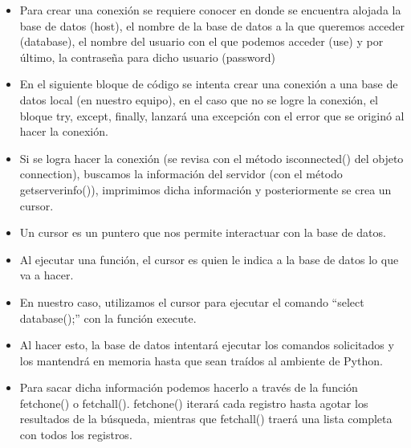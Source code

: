 \documentclass[hyperref={pdfpagelabels=false},xcolor=pst,pdf,fragile]{beamer}
\begin{document}
\begin{frame}
    \begin{itemize}
    \item Para crear una conexión se requiere conocer en donde se encuentra alojada la base de datos (host), el nombre de la base de datos a la que queremos acceder (database), el nombre del usuario con el que podemos acceder (use) y por último, la contraseña para dicho usuario (password)
    \pause
    \item En el siguiente bloque de código se intenta crear una conexión a una base de datos local (en nuestro equipo), en el caso que no se logre la conexión, el bloque try, except, finally, lanzará una excepción con el error que se originó al hacer la conexión.
    \end{itemize}
\end{frame}

\begin{frame}
    \begin{itemize}
    \item Si se logra hacer la conexión (se revisa con el método is\textunderscore connected() del objeto connection), buscamos la información del servidor (con el método get\textunderscore server\textunderscore info()), imprimimos dicha información y posteriormente se crea un cursor.
    \pause
    \item Un cursor es un puntero que nos permite interactuar con la base de datos.
    \item Al ejecutar una función, el cursor es quien le indica a la base de datos lo que va a hacer.
    \pause
    \item En nuestro caso, utilizamos el cursor para ejecutar el comando “select database();” con la función execute.
    \end{itemize}
\end{frame}

\begin{frame}
    \begin{itemize}
    \item Al hacer esto, la base de datos intentará ejecutar los comandos solicitados y los mantendrá en memoria hasta que sean traídos al ambiente de Python.
    \pause
    \item Para sacar dicha información podemos hacerlo a través de la función fetchone() o fetchall(). fetchone() iterará cada registro hasta agotar los resultados de la búsqueda, mientras que fetchall() traerá una lista completa con todos los registros.
    \end{itemize}
\end{frame}
\end{document}
